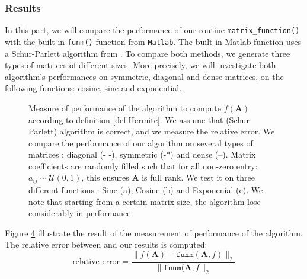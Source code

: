 \documentclass[11pt]{article}
\begin{document}
\subsubsection{Results}
In this part, we will compare the performance of our routine \texttt{matrix\_function()} with the built-in \texttt{funm()} function from \texttt{Matlab}. The built-in Matlab function uses a Schur-Parlett algorithm from \cite{davies2003schur}. To compare both methods, we generate three types of matrices of different sizes. More precisely, we will investigate both algorithm's performances on symmetric, diagonal and dense matrices, on the following functions: cosine, sine and exponential.
\begin{figure}
    \begin{subfigure}[b]{0.3\textwidth}
        
        \caption{}
        \label{fig:comp_sine}
    \end{subfigure}\hspace{.055\linewidth}
    \begin{subfigure}[b]{0.3\textwidth}
        
        \caption{}
        \label{fig:comp_cosine}
    \end{subfigure}\hspace{.025\linewidth}
    \begin{subfigure}[b]{0.3\textwidth}
        
        \caption{}
        \label{fig:comp_exp}
    \end{subfigure}
    \caption{Measure of performance of the algorithm to compute $f(\mathbf{A})$ according to definition \ref{def:Hermite}. We assume that \cite{davies2003schur} (Schur Parlett) algorithm is correct, and we measure the relative error. We compare the performance of our algorithm on several types of matrices : diagonal (- -), symmetric (-*) and dense (--). Matrix coefficients are randomly filled such that for all non-zero entry: $a_{ij}\sim\mathcal{U}(0,1)$, this ensures $\mathbf{A}$ is full rank. We test it on three different functions : Sine (a), Cosine (b) and Exponenial (c). We note that starting from a certain matrix size, the algorithm lose considerably in performance.}
    \label{fig:comp}
\end{figure}

Figure \ref{fig:comp} illustrate the result of the measurement of performance of the algorithm. The relative error between \cite{davies2003schur} and our results is computed:
\begin{equation*}
    \text{relative error} = \frac{\|f(\mathbf{A})-\texttt{funm}(\mathbf{A},f)\|_2}{\|\texttt{funm}(\mathbf{A},f\|_2}
\end{equation*}
\end{document}
